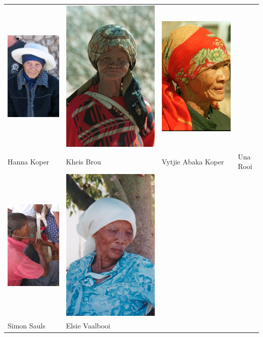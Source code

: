 \begin{tabular}{llll}
    \includegraphics[width=.2\textwidth]{kheis_s.jpg} &
    \includegraphics[width=.2\textwidth]{vytjie_s.jpg} &
    \includegraphics[width=.2\textwidth]{una_s.jpg} \\
    Hanna Koper & Kheis Brou & Vytjie \textipa{\textvertline}Abaka
    Koper & \textipa{\textvertline}Una Rooi \\
    \includegraphics[width=.2\textwidth]{simon_s.jpg} &
    \includegraphics[width=.2\textwidth]{elsie_s.jpg} \\
    Simon Sauls & Elsie Vaalbooi \\
\end{tabular}

